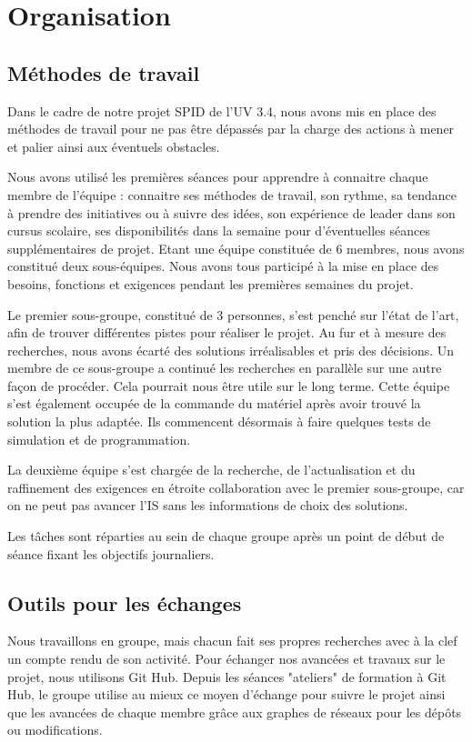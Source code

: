 \chapter{Organisation}

\section{Méthodes de travail}

Dans le cadre de notre projet SPID de l’UV 3.4, nous avons mis en place des méthodes de travail pour ne pas être dépassés par la charge des actions à mener et palier ainsi aux éventuels obstacles.  

Nous avons utilisé les premières séances pour apprendre à connaitre chaque membre de l’équipe : connaitre ses méthodes de travail, son rythme, sa tendance à prendre des initiatives ou à suivre des idées, son expérience de leader dans son cursus scolaire, ses disponibilités dans la semaine pour d’éventuelles séances supplémentaires de projet. 
Etant une équipe constituée de 6 membres, nous avons constitué deux sous-équipes. Nous avons tous participé à la mise en place des besoins, fonctions et exigences pendant les premières semaines du projet. 

Le premier sous-groupe, constitué de 3 personnes, s’est penché sur l’état de l’art, afin de trouver différentes pistes pour réaliser le projet. Au fur et à mesure des recherches, nous avons écarté des solutions irréalisables et pris des décisions. Un membre de ce sous-groupe a continué les recherches en parallèle sur une autre façon de procéder. Cela pourrait nous être utile sur le long terme. 
Cette équipe s’est également occupée de la commande du matériel après avoir trouvé la solution la plus adaptée. Ils commencent désormais à faire quelques tests de simulation et de programmation.

La deuxième équipe s'est chargée de la recherche, de l'actualisation et du raffinement des exigences en étroite collaboration avec le premier sous-groupe, car on ne peut pas avancer l’IS sans les informations de choix des solutions. 

Les tâches sont réparties au sein de chaque groupe après un point de début de séance fixant les objectifs journaliers.

\section{Outils pour les échanges}

Nous travaillons en groupe, mais chacun fait ses propres recherches avec à la clef un compte rendu de son activité. Pour échanger nos avancées et travaux sur le projet, nous utilisons Git Hub. Depuis les séances "ateliers" de formation à Git Hub, le groupe utilise au mieux ce moyen d'échange pour suivre le projet ainsi que les avancées de chaque membre grâce aux graphes de réseaux pour les dépôts ou modifications. 


